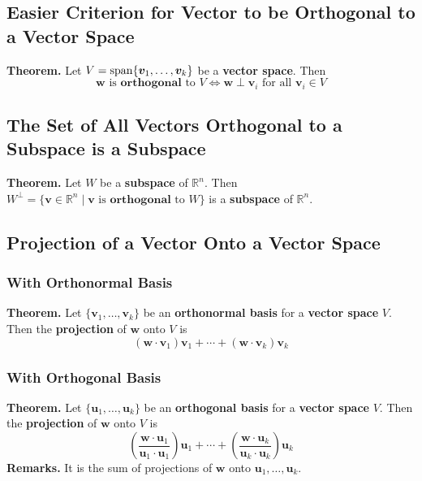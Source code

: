 \documentclass[../ma2001_notes.tex]{subfiles}
\begin{document}
\subsection{Easier Criterion for Vector to be Orthogonal to a Vector Space}
\textbf{Theorem.} Let \(V=\operatorname{span}\{\bm{v}_1,\ldots,\bm{v}_k\}\) be a \textbf{vector space}. Then
\[\bm{w}\text{ is }\textbf{orthogonal}\text{ to }V\Leftrightarrow\bm{w}\perp\bm{v}_i\text{ for all }\bm{v}_i\in V\]

\subsection{The Set of All Vectors Orthogonal to a Subspace is a Subspace}
\textbf{Theorem.} Let \(W\) be a \textbf{subspace} of \(\mathbb{R}^n\). Then \(W^\perp=\{\bm{v}\in\mathbb{R}^n\mid\bm{v}\text{ is }\textbf{orthogonal}\text{ to }W\}\) is a \textbf{subspace} of \(\mathbb{R}^n\).

\subsection{Projection of a Vector Onto a Vector Space}
\subsubsection{With Orthonormal Basis}
\textbf{Theorem.} Let \(\{\bm{v}_1,\ldots,\bm{v}_k\}\) be an \textbf{orthonormal basis} for a \textbf{vector space} \(V\). Then the \textbf{projection} of \(\bm{w}\) onto \(V\) is
\[(\bm{w}\cdot\bm{v}_1)\bm{v}_1+\cdots+(\bm{w}\cdot\bm{v}_k)\bm{v}_k\]

\subsubsection{With Orthogonal Basis}
\textbf{Theorem.} Let \(\{\bm{u}_1,\ldots,\bm{u}_k\}\) be an \textbf{orthogonal basis} for a \textbf{vector space} \(V\). Then the \textbf{projection} of \(\bm{w}\) onto \(V\) is
\[\left(\frac{\bm{w}\cdot\bm{u}_1}{\bm{u}_1\cdot\bm{u}_1}\right)\bm{u}_1+\cdots+\left(\frac{\bm{w}\cdot\bm{u}_k}{\bm{u}_k\cdot\bm{u}_k}\right)\bm{u}_k\]
\textbf{Remarks.} It is the sum of projections of \(\bm{w}\) onto \(\bm{u}_1,\ldots,\bm{u}_k\).
\end{document}
